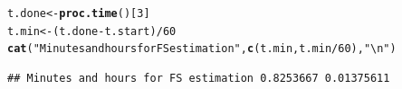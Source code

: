 \documentclass[9pt]{article}\usepackage[]{graphicx}\usepackage[]{xcolor}
\makeatletter
\newcommand{\hlnum}[1]{\textcolor[rgb]{0.686,0.059,0.569}{#1}}%
\newcommand{\hlstr}[1]{\textcolor[rgb]{0.192,0.494,0.8}{#1}}%
\newcommand{\hlopt}[1]{\textcolor[rgb]{0,0,0}{#1}}%
\newcommand{\hlstd}[1]{\textcolor[rgb]{0.345,0.345,0.345}{#1}}%
\newcommand{\hlkwb}[1]{\textcolor[rgb]{0.69,0.353,0.396}{#1}}%
\newcommand{\hlkwd}[1]{\textcolor[rgb]{0.737,0.353,0.396}{\textbf{#1}}}%
\newenvironment{kframe}{%
 \def\at@end@of@kframe{}%
 \ifinner\ifhmode%
  \def\at@end@of@kframe{\end{minipage}}%
  \begin{minipage}{\columnwidth}%
 \fi\fi%
 \def\FrameCommand##1{\hskip\@totalleftmargin \hskip-\fboxsep
 \colorbox{shadecolor}{##1}\hskip-\fboxsep
     \hskip-\linewidth \hskip-\@totalleftmargin \hskip\columnwidth}%
 \MakeFramed {\advance\hsize-\width
   \@totalleftmargin\z@ \linewidth\hsize
   \@setminipage}}%
 {\par\unskip\endMakeFramed%
 \at@end@of@kframe}
\newenvironment{knitrout}{}{} %
\theoremstyle{definition}
\theoremstyle{remark}
\makeatother
\begin{document}
\begin{knitrout}
\color{fgcolor}\begin{kframe}
\begin{alltt}
\hlstd{t.done} \hlkwb{<-} \hlkwd{proc.time}\hlstd{()[}\hlnum{3}\hlstd{]}
\hlstd{t.min} \hlkwb{<-} \hlstd{(t.done} \hlopt{-} \hlstd{t.start)}\hlopt{/}\hlnum{60}
\hlkwd{cat}\hlstd{(}\hlstr{"Minutes and hours for FS estimation"}\hlstd{,} \hlkwd{c}\hlstd{(t.min, t.min}\hlopt{/}\hlnum{60}\hlstd{),} \hlstr{"\textbackslash{}n"}\hlstd{)}
\end{alltt}
\begin{verbatim}
## Minutes and hours for FS estimation 0.8253667 0.01375611
\end{verbatim}
\end{kframe}
\end{knitrout}
\end{document}
